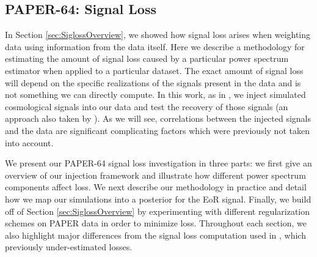 \documentclass[preprint2,numberedappendix,tighten]{aastex6}
\begin{document}

\subsection{PAPER-64: Signal Loss}
\label{sec:Sigloss}

In Section \ref{sec:SiglossOverview}, we showed how signal loss arises when weighting data using information from the data itself. Here we describe a methodology for estimating the amount of signal loss caused by a particular power spectrum estimator when applied to a particular dataset. The exact amount of signal loss will depend on the specific realizations of the signals present in the data and is not something we can directly compute. In this work, as in , we inject simulated cosmological signals into our data and test the recovery of those signals (an approach also taken by \citet{masui_et_al2013}). As we will see, correlations between the injected signals and the data are significant complicating factors which were previously not taken into account. 

We present our PAPER-64 signal loss investigation in three parts: we first give an overview of our injection framework and illustrate how different power spectrum components affect loss. We next describe our methodology in practice and detail how we map our simulations into a posterior for the EoR signal. Finally, we build off of Section \ref{sec:SiglossOverview} by experimenting with different regularization schemes on PAPER data in order to minimize loss. Throughout each section, we also highlight major differences from the signal loss computation used in , which previously under-estimated losses.

\end{document}
